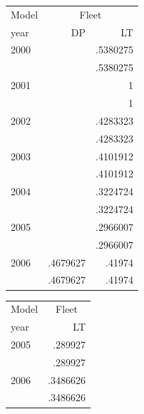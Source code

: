 \begin{tabular}{lrr}
\toprule
Model & \multicolumn{2}{c}{Fleet} \\
year & DP & LT \\
\midrule
2000 &  & .5380275 \\
 &  & .5380275 \\
2001 &  & 1 \\
 &  & 1 \\
2002 &  & .4283323 \\
 &  & .4283323 \\
2003 &  & .4101912 \\
 &  & .4101912 \\
2004 &  & .3224724 \\
 &  & .3224724 \\
2005 &  & .2966007 \\
 &  & .2966007 \\
2006 & .4679627 & .41974 \\
 & .4679627 & .41974 \\
\bottomrule
\end{tabular}

\begin{tabular}{lr}
\toprule
Model & \multicolumn{1}{c}{Fleet} \\
year & LT \\
\midrule
2005 & .289927 \\
 & .289927 \\
2006 & .3486626 \\
 & .3486626 \\
\bottomrule
\end{tabular}

